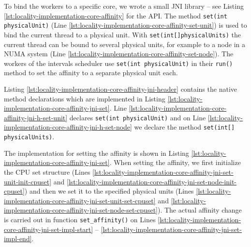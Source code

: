 To bind the workers to a specific core, we wrote a small JNI library
-- see Listing \ref{lst:locality-implementation-core-affinity} for the
API. The method \lstinline!set(int physicalUnit)!  (Line
\ref{lst:locality-implementation-core-affinity-set-unit}) is used to
bind the current thread to a physical unit. With
\lstinline!set(int[]physicalUnits)! the current thread can be bound to
several physical units, for example to a node in a NUMA system (Line
\ref{lst:locality-implementation-core-affinity-set-node}). The workers
of the intervals scheduler use \lstinline!set(int physicalUnit)! in
their \lstinline!run()! method to set the affinity to a separate
physical unit each.



Listing \ref{lst:locality-implementation-core-affinity-jni-header}
contains the native method declarations which are implemented in
Listing \ref{lst:locality-implementation-core-affinity-jni-set}. Line
\ref{lst:locality-implementation-core-affinity-jni-h-set-unit}
declares \lstinline!set(int physicalUnit)! and on Line
\ref{lst:locality-implementation-core-affinity-jni-h-set-node} we
declare the method \lstinline!set(int[] physicalUnits)!.





The implementation for setting the affinity is shown in Listing
\ref{lst:locality-implementation-core-affinity-jni-set}. When setting
the affinity, we first initialize the CPU set structure (Lines
\ref{lst:locality-implementation-core-affinity-jni-set-unit-init-cpuset}
and
\ref{lst:locality-implementation-core-affinity-jni-set-node-init-cpuset})
and then we set it to the specified physical units (Lines
\ref{lst:locality-implementation-core-affinity-jni-set-unit-set-cpuset}
and
\ref{lst:locality-implementation-core-affinity-jni-set-node-set-cpuset}). The
actual affinity change is carried out in function
\lstinline!set_affinity()! on Lines
\ref{lst:locality-implementation-core-affinity-jni-set-impl-start} --
\ref{lst:locality-implementation-core-affinity-jni-set-impl-end}.

